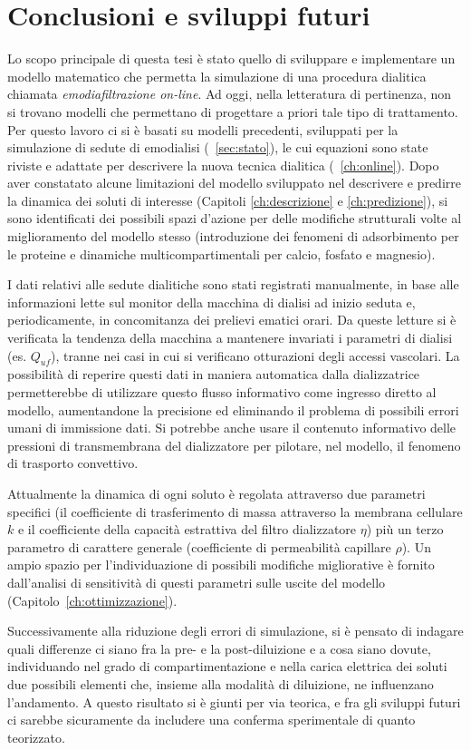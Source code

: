 \chapter{Conclusioni e sviluppi futuri}\label{ch:end}
Lo scopo principale di questa tesi è stato quello di sviluppare e implementare un modello matematico che permetta la simulazione di una procedura dialitica chiamata \textit{emodiafiltrazione on-line}. Ad oggi, nella letteratura di pertinenza, non si trovano modelli che permettano di progettare a priori tale tipo di trattamento. Per questo lavoro ci si è basati su modelli precedenti, sviluppati per la simulazione di sedute di emodialisi (\textsection~\ref{sec:stato}), le cui equazioni sono state riviste e adattate per descrivere la nuova tecnica dialitica (\chaptername~\ref{ch:online}).
Dopo aver constatato alcune limitazioni del modello sviluppato nel descrivere e predirre la dinamica dei soluti di interesse (Capitoli \ref{ch:descrizione} e \ref{ch:predizione}), si sono identificati dei possibili spazi d'azione per delle modifiche strutturali volte al miglioramento del modello stesso (introduzione dei fenomeni di adsorbimento per le proteine e dinamiche multicompartimentali per calcio, fosfato e magnesio).

I dati relativi alle sedute dialitiche sono stati registrati manualmente, in base alle informazioni lette sul monitor della macchina di dialisi ad inizio seduta e, periodicamente, in concomitanza dei prelievi ematici orari. Da queste letture si è verificata la tendenza della macchina a mantenere invariati i parametri di dialisi (es. $Q_{uf}$), tranne nei casi in cui si verificano otturazioni degli accessi vascolari. La possibilità di reperire questi dati in maniera automatica dalla dializzatrice permetterebbe di utilizzare questo flusso informativo come ingresso diretto al modello, aumentandone la precisione ed eliminando il problema di possibili errori umani di immissione dati. Si potrebbe anche usare il contenuto informativo delle pressioni di transmembrana del dializzatore per pilotare, nel modello, il fenomeno di trasporto convettivo.

Attualmente la dinamica di ogni soluto è regolata attraverso due parametri specifici (il coefficiente di trasferimento di massa attraverso la membrana cellulare $k$ e il coefficiente della capacità estrattiva del filtro dializzatore $\eta$) più un terzo parametro di carattere generale (coefficiente di permeabilità capillare $\rho$). Un ampio spazio per l'individuazione di possibili modifiche migliorative è fornito dall'analisi di sensitività di questi parametri sulle uscite del modello (Capitolo~\ref{ch:ottimizzazione}).

Successivamente alla riduzione degli errori di simulazione, si è pensato di indagare quali differenze ci siano fra la pre- e la post-diluizione e a cosa siano dovute, individuando nel grado di compartimentazione e nella carica elettrica dei soluti due possibili elementi che, insieme alla modalità di diluizione, ne influenzano l'andamento. A questo risultato si è giunti per via teorica, e fra gli sviluppi futuri ci sarebbe sicuramente da includere una conferma sperimentale di quanto teorizzato.
